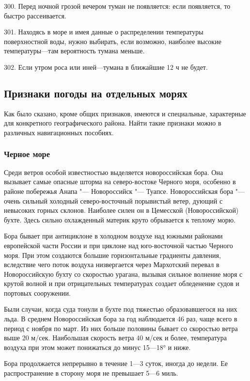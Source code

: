 300. Перед ночной грозой вечером туман не появляется: если появляется, то быстро рассеивается.

301. Находясь в море и имея данные о распределении температуры поверхностной воды, нужно выбирать, если возможно, наиболее высокие температуры—там вероятность тумана меньше.

302. Если утром роса или иней—тумана в ближайшие 12 ч не будет.

\subsection{Признаки погоды на отдельных морях}

Как было сказано, кроме общих признаков, имеются и специальные, характерные для конкретного географического района. Найти такие признаки можно в различных навигационных пособиях.

\subsubsection{Черное море}

Среди ветров особой известностью выделяется новороссийская бора. Она
вызывает самые опасные шторма на северо-востоке Черного моря, особенно
в районе побережья Анапа "--- Новороссийск "--- Туапсе. Новороссийская
бора "--- очень сильный холодный северо-восточный порывистый ветер,
дующий с невысоких горных склонов. Наиболее силен он в Цемесской
(Новороссийской) бухте. Здесь сильно охлажденный материк круто
обрывается к теплому морю.

Бора бывает при антициклоне в холодном воздухе над южными районами европейской части России и при циклоне над юго-восточной частью Черного моря. При этом создаются большие горизонтальные градиенты давления, вследствие чего поток воздуха низвергается через Мархотский перевал в Новороссийскую бухту со скоростью урагана, вызывая сильное волнение моря с крутой волной и при отрицательных температурах создает обледенение судов и портовых сооружении.

Были случаи, когда суда тонули в бухте под тяжестью образовавшегося на них льда. В среднем Новороссийская бора за год наблюдается 46 раз, чаще всего в период с ноября по март. Из них больше половины бывает со скоростью ветра выше 20 м/сек. Наибольшая скорость ветра 40 м/сек и более, температура воздуха при этом может понижаться до минус 15—18° и ниже.

Бора продолжается непрерывно в течение 1—3 суток, иногда до недели. Ее распространение в сторону моря не превышает 5—6 миль.

